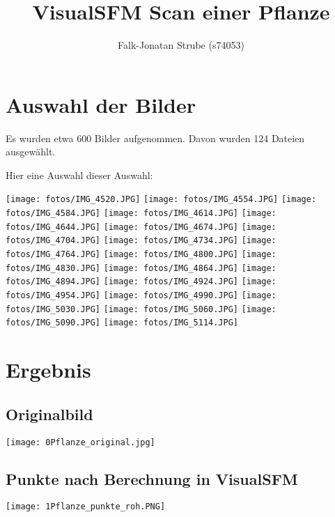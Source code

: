 \documentclass{scrartcl}
\title{VisualSFM Scan einer Pflanze}
\author{Falk-Jonatan Strube (s74053)}
\begin{document}
\maketitle
\tableofcontents

\section{Auswahl der Bilder}
Es wurden etwa 600 Bilder aufgenommen. Davon wurden 124 Dateien ausgewählt.

Hier eine Auswahl dieser Auswahl:
\begin{center}
\texttt{[image: fotos/IMG\_4520.JPG]}
\texttt{[image: fotos/IMG\_4554.JPG]}
\texttt{[image: fotos/IMG\_4584.JPG]}
\texttt{[image: fotos/IMG\_4614.JPG]}
\texttt{[image: fotos/IMG\_4644.JPG]}
\texttt{[image: fotos/IMG\_4674.JPG]}
\texttt{[image: fotos/IMG\_4704.JPG]}
\texttt{[image: fotos/IMG\_4734.JPG]}
\texttt{[image: fotos/IMG\_4764.JPG]}
\texttt{[image: fotos/IMG\_4800.JPG]}
\texttt{[image: fotos/IMG\_4830.JPG]}
\texttt{[image: fotos/IMG\_4864.JPG]}
\texttt{[image: fotos/IMG\_4894.JPG]}
\texttt{[image: fotos/IMG\_4924.JPG]}
\texttt{[image: fotos/IMG\_4954.JPG]}
\texttt{[image: fotos/IMG\_4990.JPG]}
\texttt{[image: fotos/IMG\_5030.JPG]}
\texttt{[image: fotos/IMG\_5060.JPG]}
\texttt{[image: fotos/IMG\_5090.JPG]}
\texttt{[image: fotos/IMG\_5114.JPG]}
\end{center}

\section{Ergebnis}

\subsection{Originalbild}
\begin{center}
\texttt{[image: 0Pflanze\_original.jpg]}
\end{center}
\subsection{Punkte nach Berechnung in VisualSFM}
\begin{center}
\texttt{[image: 1Pflanze\_punkte\_roh.PNG]}
\end{center}
\end{document}

